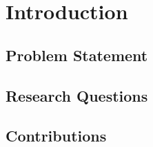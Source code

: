 
\chapter{Introduction}
\label{ch:introduction}


\section{Problem Statement}
\label{sec:problem_statement}


\section{Research Questions}
\label{sec:research_questions}


\section{Contributions}
\label{sec:contributions}

